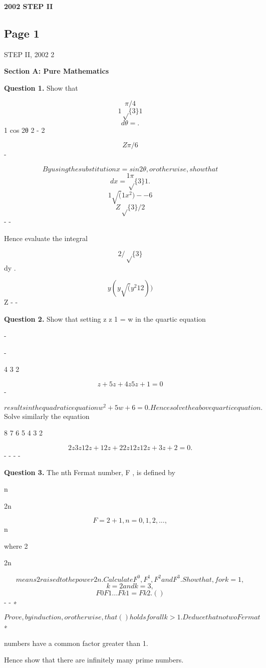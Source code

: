\documentclass[12pt]{article}
\begin{document}
\begin{center}
{\Large \textbf{2002 STEP II}}
\end{center}

\subsection*{Page 1}
\begin{flushleft}
STEP II, 2002 2\par
\bigskip\textbf{Section A: Pure Mathematics}\par
\bigskip\textbf{Question 1.} Show that\par
\[\pi/4\]
\[1 \sqrt\{3\} 1\]
\[dθ = .\]
1 cos 2θ 2 - 2\par
\[Z\pi/6\]
-\par
\[By using the substitution x = sin 2θ, or otherwise, show that\]
\[1 \pi\]
\[dx = \sqrt\{3\} 1 .\]
\[1 \sqrt(1 x^2) - - 6\]
\[Z\sqrt\{3\}/2\]
- -\par
Hence evaluate the integral\par
\[2/\sqrt\{3\}\]
dy .\par
\[y(y \sqrt(y^2 12))\]
Z - -\par
\bigskip\textbf{Question 2.} Show that setting z z 1 = w in the quartic equation\par
-\par
-\par
4 3 2\par
\[z + 5z + 4z 5z + 1 = 0\]
-\par
\[results in the quadratic equation w^2 + 5w + 6 = 0. Hence solve the above quartic equation.\]
Solve similarly the equation\par
8 7 6 5 4 3 2\par
\[2z 3z 12z + 12z + 22z 12z 12z + 3z + 2 = 0 .\]
- - - -\par
\bigskip\textbf{Question 3.} The nth Fermat number, F , is defined by\par
n\par
2n\par
\[F = 2 + 1 , n = 0, 1, 2, . . . ,\]
n\par
where 2\par
2n\par
\[means 2 raised to the power 2n . Calculate F^0, F^1, F^2 and F^3 . Show that, for k = 1,\]
\[k = 2 and k = 3 ,\]
\[F0F1 . . . F k 1 = F k 2 . ( )\]
- - ∗\par
\[Prove, by induction, or otherwise, that ( ) holds for all k > 1. Deduce that no two Fermat\]
∗\par
numbers have a common factor greater than 1.\par
Hence show that there are infinitely many prime numbers.\par
\end{flushleft}
\end{document}
